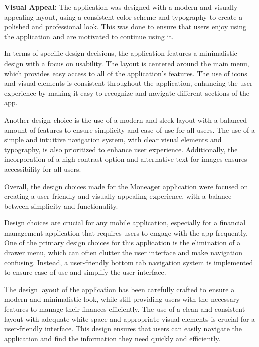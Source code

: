 \hspace{\parindent}\textbf{Visual Appeal:} The application was designed with a modern and visually appealing layout, using a consistent color scheme and typography to create a polished and professional look. This was done to ensure that users enjoy using the application and are motivated to continue using it.

\hspace{\parindent}In terms of specific design decisions, the application features a minimalistic design with a focus on usability. The layout is centered around the main menu, which provides easy access to all of the application's features. The use of icons and visual elements is consistent throughout the application, enhancing the user experience by making it easy to recognize and navigate different sections of the app.


\hspace{\parindent}Another design choice is the use of a modern and sleek layout with a balanced amount of features to ensure simplicity and ease of use for all users. The use of a simple and intuitive navigation system, with clear visual elements and typography, is also prioritized to enhance user experience. Additionally, the incorporation of a high-contrast option and alternative text for images ensures accessibility for all users.

\hspace{\parindent}Overall, the design choices made for the Moneager application were focused on creating a user-friendly and visually appealing experience, with a balance between simplicity and functionality.\




\hspace{\parindent}Design choices are crucial for any mobile application, especially for a financial management application that requires users to engage with the app frequently. One of the primary design choices for this application is the elimination of a drawer menu, which can often clutter the user interface and make navigation confusing. Instead, a user-friendly bottom tab navigation system is implemented to ensure ease of use and simplify the user interface.

\hspace{\parindent}The design layout of the application has been carefully crafted to ensure a modern and minimalistic look, while still providing users with the necessary features to manage their finances efficiently. The use of a clean and consistent layout with adequate white space and appropriate visual elements is crucial for a user-friendly interface. This design ensures that users can easily navigate the application and find the information they need quickly and efficiently.





